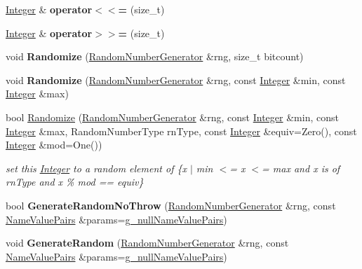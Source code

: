 \begin{DoxyCompactItemize}
\item 
\hypertarget{class_integer_ab2cd5813a8ec1e1453601d2ab9997af4}{
\hyperlink{class_integer}{Integer} \& {\bfseries operator$<$$<$=} (size\_\-t)}
\label{class_integer_ab2cd5813a8ec1e1453601d2ab9997af4}

\item 
\hypertarget{class_integer_a37f1289c7ed8f8ff11982b5fa73db224}{
\hyperlink{class_integer}{Integer} \& {\bfseries operator$>$$>$=} (size\_\-t)}
\label{class_integer_a37f1289c7ed8f8ff11982b5fa73db224}

\item 
\hypertarget{class_integer_a0f0574b9cae3cddf62c155da93085f0d}{
void {\bfseries Randomize} (\hyperlink{class_random_number_generator}{RandomNumberGenerator} \&rng, size\_\-t bitcount)}
\label{class_integer_a0f0574b9cae3cddf62c155da93085f0d}

\item 
\hypertarget{class_integer_aae8e0904d1752629f59f0343507c7f8b}{
void {\bfseries Randomize} (\hyperlink{class_random_number_generator}{RandomNumberGenerator} \&rng, const \hyperlink{class_integer}{Integer} \&min, const \hyperlink{class_integer}{Integer} \&max)}
\label{class_integer_aae8e0904d1752629f59f0343507c7f8b}

\item 
bool \hyperlink{class_integer_a83dd6a11aa51d545ce2735777787b622}{Randomize} (\hyperlink{class_random_number_generator}{RandomNumberGenerator} \&rng, const \hyperlink{class_integer}{Integer} \&min, const \hyperlink{class_integer}{Integer} \&max, RandomNumberType rnType, const \hyperlink{class_integer}{Integer} \&equiv=Zero(), const \hyperlink{class_integer}{Integer} \&mod=One())
\begin{DoxyCompactList}\small\item\em set this \hyperlink{class_integer}{Integer} to a random element of \{x $|$ min $<$= x $<$= max and x is of rnType and x \% mod == equiv\} \item\end{DoxyCompactList}\item 
\hypertarget{class_integer_ad330521e84a900a80e8dd90e97796e17}{
bool {\bfseries GenerateRandomNoThrow} (\hyperlink{class_random_number_generator}{RandomNumberGenerator} \&rng, const \hyperlink{class_name_value_pairs}{NameValuePairs} \&params=\hyperlink{cryptlib_8h_ab1b0f7d11a21c6163be8ca2662ce2ac6}{g\_\-nullNameValuePairs})}
\label{class_integer_ad330521e84a900a80e8dd90e97796e17}

\item 
\hypertarget{class_integer_a0d9a427fe64a454b11b24fe61c10dbeb}{
void {\bfseries GenerateRandom} (\hyperlink{class_random_number_generator}{RandomNumberGenerator} \&rng, const \hyperlink{class_name_value_pairs}{NameValuePairs} \&params=\hyperlink{cryptlib_8h_ab1b0f7d11a21c6163be8ca2662ce2ac6}{g\_\-nullNameValuePairs})}
\label{class_integer_a0d9a427fe64a454b11b24fe61c10dbeb}


\end{DoxyCompactItemize}
